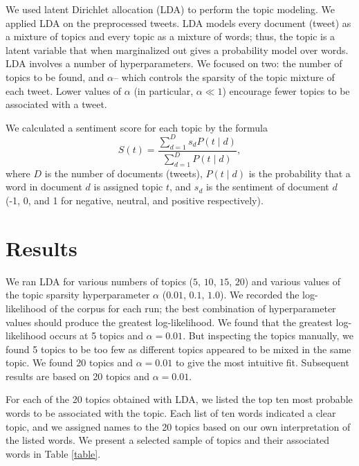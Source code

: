 \documentclass{sig-alternate-05-2015}
\begin{document}
We used latent Dirichlet allocation (LDA) to perform the topic modeling. We applied LDA on the preprocessed tweets.
%
LDA models every document (tweet) as a mixture of topics and every topic as a mixture of words; thus, the topic is a latent variable that when marginalized out gives a probability model over words.
%
LDA involves a number of hyperparameters. We focused on two: the number of topics to be found, and $\alpha$-- which controls the sparsity of the topic mixture of each tweet. Lower values of $\alpha$ (in particular, $\alpha \ll 1$) encourage fewer topics to be associated with a tweet.

We calculated a sentiment score for each topic by the formula
\begin{equation} \label{eq}
S(t) = \frac{\sum_{d=1}^D s_d P(t\mid d)}{\sum_{d=1}^D P(t\mid d)},
\end{equation}
where $D$ is the number of documents (tweets), $P(t\mid d)$ is the probability that a word in document $d$ is assigned topic $t$, and $s_d$ is the sentiment of document $d$ (-1, 0, and 1 for negative, neutral, and positive respectively).

\section{Results}

We ran LDA for various numbers of topics ($5$, $10$, $15$, $20$) and various values of the topic sparsity hyperparameter $\alpha$ ($0.01$, $0.1$, $1.0$).
%
We recorded the log-likelihood of the corpus for each run; the best combination of hyperparameter values should produce the greatest log-likelihood.
%
We found that the greatest log-likelihood occurs at 5 topics and $\alpha = 0.01$. But inspecting the topics manually, we found 5 topics to be too few as different topics appeared to be mixed in the same topic. We found 20 topics and $\alpha = 0.01$ to give the most intuitive fit. Subsequent results are based on 20 topics and $\alpha = 0.01$.

For each of the 20 topics obtained with LDA, we listed the top ten most probable words to be associated with the topic.
%
Each list of ten words indicated a clear topic, and we assigned names to the 20 topics based on our own interpretation of the listed words.
%
We present a selected sample of topics and their associated words in Table \ref{table}.
\end{document}

